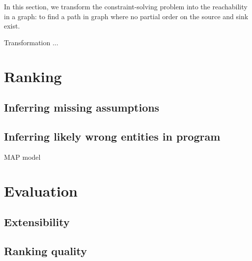 In this section, we transform the constraint-solving problem into the
reachability in a graph: to find a path in graph where no partial order on the
source and sink exist. 

Transformation ... 

% 
% 
% 
% 
% 
% 
\section{Ranking}
\label{sec:ranking}

\subsection{Inferring missing assumptions}

\subsection{Inferring likely wrong entities in program}

MAP model

\section{Evaluation}

\subsection{Extensibility}

\subsection{Ranking quality}

